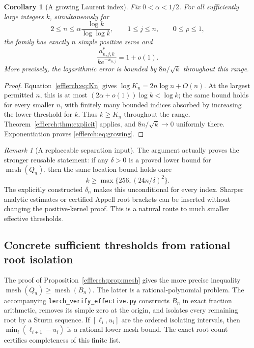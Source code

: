 \documentclass[11pt,letterpaper]{article}
\newtheorem{corollary}[theorem]{Corollary}
\theoremstyle{definition}
\theoremstyle{remark}
\newtheorem{remark}[theorem]{Remark}
\begin{document}
\begin{corollary}[A growing Laurent index]
\label{efflerch:cor:growing}
Fix $0<\alpha<1/2$.  For all sufficiently large integers $k$,
simultaneously for
\[
 2\leq n\leq\alpha\frac{\log k}{\log\log k},\qquad
 1\leq j\leq n,\qquad 0\leq\rho\leq1,
\]
the family has exactly $n$ simple positive zeros and
\begin{equation}\label{efflerch:eq:growing}
 \frac{a_{n,j,k}^\rho}{k e^{-x_{n,j}}}=1+o(1).
\end{equation}
More precisely, the logarithmic error is bounded by $8n/\sqrt{k}$
throughout this range.
\end{corollary}
\begin{proof}
Equation~\eqref{efflerch:eq:Kn} gives
$\log K_n=2n\log n+O(n)$.  At the largest permitted $n$, this is
at most $(2\alpha+o(1))\log k<\log k$; the same bound holds for
every smaller $n$, with finitely many bounded indices absorbed by
increasing the lower threshold for $k$.  Thus $k\geq K_n$ throughout
the range.  Theorem~\ref{efflerch:thm:explicit} applies, and
$8n/\sqrt{k}\to0$ uniformly there.  Exponentiation proves
\eqref{efflerch:eq:growing}.
\end{proof}

\begin{remark}[A replaceable separation input]
The argument actually proves the stronger reusable statement: if any
$\delta>0$ is a proved lower bound for $\operatorname{mesh}(Q_n)$, then
the same location bound holds once
\[
 k\geq\max\{256,(24n/\delta)^2\}.
\]
The explicitly constructed $\delta_n$ makes this unconditional for every
index.  Sharper analytic estimates or certified Appell root brackets can
be inserted without changing the positive-kernel proof.  This is a
natural route to much smaller effective thresholds.
\end{remark}

\subsection{Concrete sufficient thresholds from rational root isolation}

The proof of Proposition~\ref{efflerch:prop:mesh} gives the more precise
inequality $\operatorname{mesh}(Q_n)\geq\operatorname{mesh}(B_n)$.
The latter is a rational-polynomial problem.  The accompanying
\texttt{lerch\_verify\_effective.py} constructs $B_n$ in exact fraction
arithmetic, removes its simple zero at the origin, and isolates every
remaining root by a Sturm sequence.  If $[\ell_i,u_i]$ are the ordered
isolating intervals, then
$\min_i(\ell_{i+1}-u_i)$ is a rational lower mesh bound.
The exact root count certifies completeness of this finite list.
\end{document}
